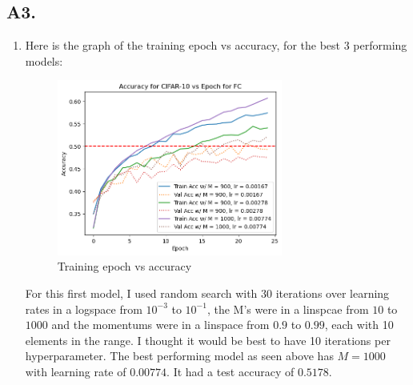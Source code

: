 \documentclass[12pt]{article}
\theoremstyle{definitionstyle}
\begin{document}
    \subsection*{A3.}
    \begin{enumerate}[label=\alph*.]
        \item Here is the graph of the training epoch vs accuracy, for the best 3 performing models:
        \begin{figure}[H]
            \centering
            \includegraphics[width=0.7\textwidth]{FC_acc.png}
            \caption{Training epoch vs accuracy}
        \end{figure}
        For this first model, I used random search with $30$ iterations over learning rates in a logspace from $10^{-3}$ to $10^{-1}$, the M's were in a linspcae from $10$ to $1000$ and the momentums were in a linspace from $0.9$ to $0.99$, each with 10 elements in the range. I thought it would be best to have 10 iterations per hyperparameter. The best performing model as seen above has $M=1000$ with learning rate of $0.00774$. It had a test accuracy of $0.5178$.


\end{enumerate}
\end{document}
